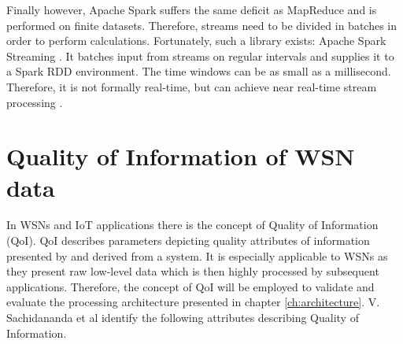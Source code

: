 Finally however, Apache Spark suffers the same deficit as MapReduce and is performed on finite datasets. Therefore, streams need to be divided in batches in order to perform calculations. Fortunately, such a library exists: Apache Spark Streaming \cite{web:spark_streaming}. It batches input from streams on regular intervals and supplies it to a Spark RDD environment. The time windows can be as small as a millisecond. Therefore, it is not formally real-time, but can achieve near real-time stream processing \cite{dstreams}.

\section{Quality of Information of WSN data}
\label{sec:back:qoi}
In WSNs and IoT applications there is the concept of Quality of Information (QoI). QoI describes parameters depicting quality attributes of information presented by and derived from a system. It is especially applicable to WSNs as they present raw low-level data which is then highly processed by subsequent applications. Therefore, the concept of QoI will be employed to validate and evaluate the processing architecture presented in chapter \ref{ch:architecture}. V. Sachidananda et al \cite{qoi_definition} identify the following attributes describing Quality of Information.

